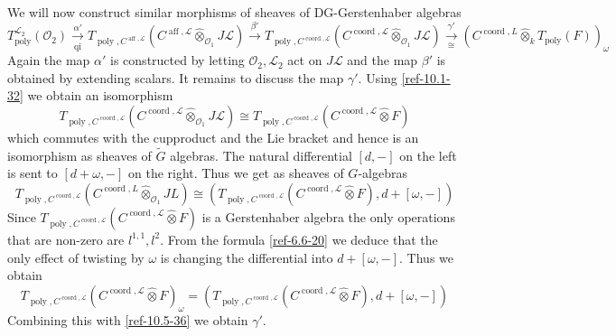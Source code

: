 \documentclass{amsart}
\numberwithin{equation}{section}
\let\cal\mathcal
\theoremstyle{definition}
\theoremstyle{remark}
\begin{document}
We will now construct similar morphisms of sheaves of DG-Gerstenhaber
algebras
\[
T_{\operatorname{poly}}^{{{\cal L}}_2}({{\cal O}}_2)\xrightarrow[\text{qi}]{\alpha'}
T_{{\operatorname{poly}},C^{{\operatorname{aff}},{{\cal L}}}}(C^{{\operatorname{aff}},{{\cal L}}}{\mathbin{\hat{\otimes}}}_{{{\cal O}}_1} J{{\cal L}})
\xrightarrow{\beta'}
T_{{\operatorname{poly}},C^{{\operatorname{coord}},{{\cal L}}}}(C^{{\operatorname{coord}},{{\cal L}}}{\mathbin{\hat{\otimes}}}_{{{\cal O}}_1} J{{\cal L}})
\xrightarrow[\cong]{\gamma'}
(C^{{\operatorname{coord}},L} {\mathbin{\hat{\otimes}}}_k T_{\operatorname{poly}}(F))_{\omega}
\]
Again  the map $\alpha'$ is constructed by letting ${{\cal O}}_2,{{\cal L}}_2$ act on
$J{{\cal L}}$ and the map $\beta'$ is obtained by extending scalars.  It remains to
discuss the map $\gamma'$.
Using \eqref{ref-10.1-32} we obtain an
isomorphism
\[
T_{{\operatorname{poly}},C^{{\operatorname{coord}},{{\cal L}}}}(C^{{\operatorname{coord}},{{\cal L}}}{\mathbin{\hat{\otimes}}}_{{{\cal O}}_1} J{{\cal L}})
\cong T_{{\operatorname{poly}},C^{{\operatorname{coord}},{{\cal L}}}}(C^{{\operatorname{coord}},{{\cal L}}}{\mathbin{\hat{\otimes}}} F)
\]
which commutes with the cupproduct and the Lie bracket and hence is an
isomorphism as sheaves of $\widetilde{G}$ algebras.  The natural
differential $[d,-]$ on the left is sent to $[d+\omega,-]$ on the
right. Thus we get as sheaves of $G$-algebras
\begin{equation}
\label{ref-10.5-36}
T_{{\operatorname{poly}},C^{{\operatorname{coord}},{{\cal L}}}}(C^{{\operatorname{coord}},L}{\mathbin{\hat{\otimes}}}_{{{\cal O}}_1} JL)
\cong (T_{{\operatorname{poly}},C^{{\operatorname{coord}},{{\cal L}}}}(C^{{\operatorname{coord}},{{\cal L}}}{\mathbin{\hat{\otimes}}} F),d+[\omega,-])
\end{equation}
Since $T_{{\operatorname{poly}},C^{{\operatorname{coord}},{{\cal L}}}}(C^{{\operatorname{coord}},{{\cal L}}}{\mathbin{\hat{\otimes}}} F)$ is a
Gerstenhaber algebra the only operations that are non-zero are
$l^{1,1},l^2$. From the formula \eqref{ref-6.6-20} we deduce that the only
effect of twisting by $\omega$ is changing the differential into
$d+[\omega,-]$. Thus we obtain
\[
T_{{\operatorname{poly}},C^{{\operatorname{coord}},{{\cal L}}}}(C^{{\operatorname{coord}},{{\cal L}}}{\mathbin{\hat{\otimes}}} F)_\omega=
 (T_{{\operatorname{poly}},C^{{\operatorname{coord}},{{\cal L}}}}(C^{{\operatorname{coord}},{{\cal L}}}{\mathbin{\hat{\otimes}}} F),d+[\omega,-])
\]
Combining this with \eqref{ref-10.5-36} we obtain $\gamma'$.
\end{document}
